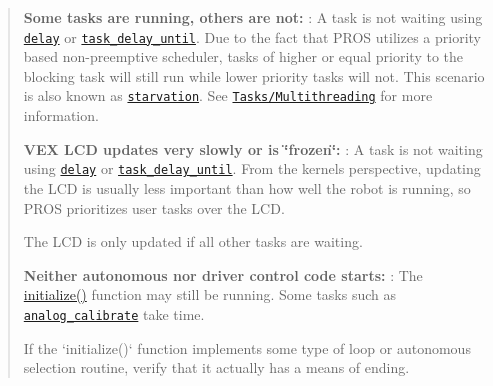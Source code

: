 \begin{quote}

\begin{DoxyItemize}
\item {\bfseries Some tasks are running, others are not\+:} \+: A task is not waiting using \href{../../api/c/rtos.html#delay}{\tt delay} or \href{../../api/c/rtos.html#task-delay-until}{\tt task\+\_\+delay\+\_\+until}. Due to the fact that P\+R\+OS utilizes a priority based non-\/preemptive scheduler, tasks of higher or equal priority to the blocking task will still run while lower priority tasks will not. This scenario is also known as \href{https://en.wikipedia.org/wiki/Starvation_(computer_science)}{\tt starvation}. See \href{/tutorials/topical/multitasking}{\tt Tasks/\+Multithreading} for more information.
\item {\bfseries V\+EX L\+CD updates very slowly or is \char`\"{}frozen\char`\"{}\+:} \+: A task is not waiting using \href{../../api/c/rtos.html#delay}{\tt delay} or \href{../../api/c/rtos.html#task-delay-until}{\tt task\+\_\+delay\+\_\+until}. From the kernel\textquotesingle{}s perspective, updating the L\+CD is usually less important than how well the robot is running, so P\+R\+OS prioritizes user tasks over the L\+CD. \begin{DoxyVerb}The LCD is only updated if all other tasks are waiting.
\end{DoxyVerb}

\item {\bfseries Neither autonomous nor driver control code starts\+:} \+: The {\ttfamily \hyperlink{main_8h_a9efe22aaead3a5e936b5df459de02eba}{initialize()}} function may still be running. Some tasks such as \href{../../api/c/adi.html#analog-calibrate}{\tt analog\+\_\+calibrate} take time. \begin{DoxyVerb}If the `initialize()` function implements some type of loop or
autonomous selection routine, verify that it actually has a
means of ending.
\end{DoxyVerb}


\end{DoxyItemize}
\end{quote}
